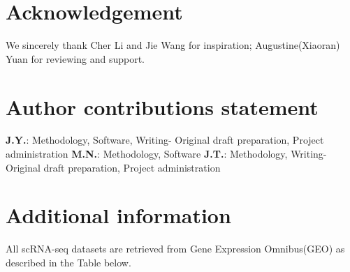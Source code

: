 \documentclass[fleqn,10pt]{wlscirep}
\begin{document}

\section*{Acknowledgement}
  We sincerely thank Cher Li and Jie Wang for inspiration; Augustine(Xiaoran) Yuan for reviewing and support.




\section*{Author contributions statement}
  \textbf{J.Y.}: Methodology, Software, Writing- Original draft preparation, Project administration
  \textbf{M.N.}: Methodology, Software
  \textbf{J.T.}: Methodology, Writing- Original draft preparation, Project administration

\section*{Additional information}
  All scRNA-seq datasets are retrieved from Gene Expression Omnibus(GEO) as described in the Table below.
\end{document}
